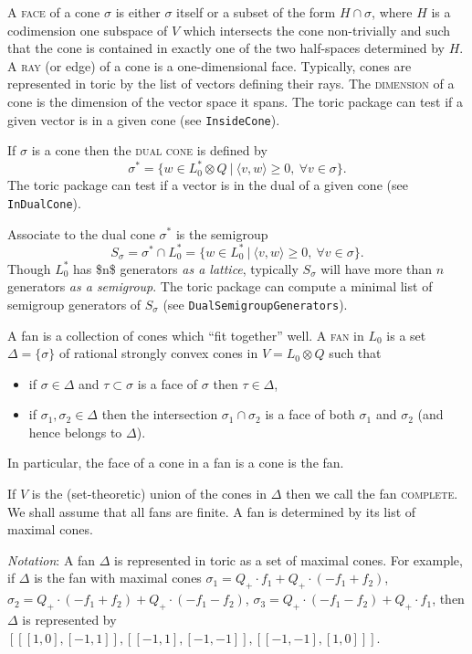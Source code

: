 \documentclass[a4paper,11pt]{report}
\begin{document}
{{{ A \textsc{face} of a cone $\sigma$ is either $\sigma$ itself or a subset of the form $H\cap \sigma$, where $H$ is a codimension one subspace of $V$ which intersects the cone non-trivially and such that the cone is contained in
exactly one of the two half-spaces determined by $H$. A \textsc{ray} (or edge) of a cone is a one-dimensional face.  Typically, cones are represented in \textsf{toric} by the list of vectors defining their rays. The \textsc{dimension} of a cone is the dimension of the vector space it spans. The \textsf{toric} package can test if a given vector is in a given cone (see \texttt{InsideCone}). 

 If $\sigma$ is a cone then the \textsc{dual cone} is defined by 
\[ \sigma^* =\{w \in L_0^*\otimes Q \ |\ \langle v,w \rangle \geq 0,\ \forall
v\in \sigma\}. \]
 The \textsf{toric} package can test if a vector is in the dual of a given cone (see \texttt{InDualCone}).  

 Associate to the dual cone $\sigma^*$ is the semigroup 
\[ S_\sigma =\sigma^*\cap L_0^* =\{w\in L_0^* \ |\ \langle v,w\rangle \geq 0,\
\forall v\in \sigma\}. \]
 Though $L_0^*$ has \$n\$ generators \emph{as a lattice}, typically $S_\sigma$ will have more than $n$ generators \emph{as a semigroup}. The \textsf{toric} package can compute a minimal list of semigroup generators of $S_\sigma$ (see \texttt{DualSemigroupGenerators}).  

 A fan is a collection of cones which ``fit together'' well. A \textsc{fan} in $L_0$ is a set $\Delta=\{\sigma \}$ of rational strongly convex cones in $V= L_0 \otimes Q$ such that 
\begin{itemize}
\item  if $\sigma \in \Delta$ and $\tau \subset \sigma$ is a face of $\sigma$ then $\tau \in \Delta$, 
\item  if $\sigma_1, \sigma_2 \in \Delta$ then the intersection $\sigma_1 \cap \sigma_2$ is a face of both $\sigma_1$ and $\sigma_2$ (and hence belongs to $\Delta$). 
\end{itemize}
 In particular, the face of a cone in a fan is a cone is the fan. 

 If $V$ is the (set-theoretic) union of the cones in $\Delta$ then we call the fan \textsc{complete}. We shall assume that all fans are finite. A fan is determined by its list of
maximal cones. \index{fan} 

 \emph{Notation}: A fan $\Delta$ is represented in \textsf{toric} as a set of maximal cones. For example, if $\Delta$ is the fan with maximal cones $\sigma_1=Q_+\cdot f_1+Q_+\cdot (-f_1+f_2)$, $\sigma_2=Q_+\cdot (-f_1+f_2)+Q_+\cdot (-f_1-f_2)$, $\sigma_3=Q_+\cdot (-f_1-f_2)+Q_+\cdot f_1$, then $\Delta$ is represented by $[[[1,0],[-1,1]],[[-1,1],[-1,-1]],[[-1,-1],[1,0]]]$. 

}}}
\end{document}
